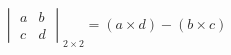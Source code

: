 \documentclass[border=2pt,varwidth=true]{standalone}
\begin{document}
\begin{displaymath}
\begin{vmatrix} a & b \\ c & d \end{vmatrix}_{2 \times 2} = (a \times d) - (b \times c)
\end{displaymath}
\end{document}
